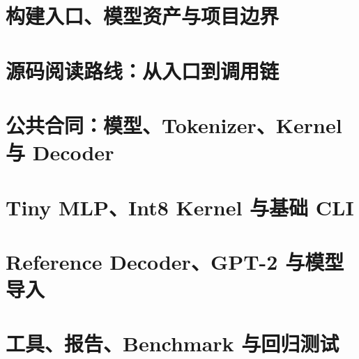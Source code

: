 \documentclass[UTF8,openany,zihao=5,fontset=none]{ctexbook}
\begin{document}
\frontmatter



\tableofcontents

\mainmatter

\chapter{构建入口、模型资产与项目边界}


\chapter{源码阅读路线：从入口到调用链}


\chapter{公共合同：模型、Tokenizer、Kernel 与 Decoder}


\chapter{Tiny MLP、Int8 Kernel 与基础 CLI}


\chapter{Reference Decoder、GPT-2 与模型导入}


\chapter{工具、报告、Benchmark 与回归测试}


\backmatter

\printindex
\end{document}
